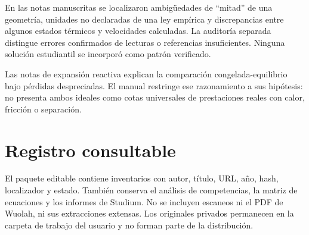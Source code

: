 En las notas manuscritas se localizaron ambigüedades de ``mitad'' de una geometría, unidades no declaradas de una ley empírica y discrepancias entre algunos estados térmicos y velocidades calculadas. La auditoría separada distingue errores confirmados de lecturas o referencias insuficientes. Ninguna solución estudiantil se incorporó como patrón verificado.

Las notas de expansión reactiva explican la comparación congelada-equilibrio bajo pérdidas despreciadas. El manual restringe ese razonamiento a sus hipótesis: no presenta ambos ideales como cotas universales de prestaciones reales con calor, fricción o separación.
\section{Registro consultable}
El paquete editable contiene inventarios con autor, título, URL, año, hash, localizador y estado. También conserva el análisis de competencias, la matriz de ecuaciones y los informes de Studium. No se incluyen escaneos ni el PDF de Wuolah, ni sus extracciones extensas. Los originales privados permanecen en la carpeta de trabajo del usuario y no forman parte de la distribución.
